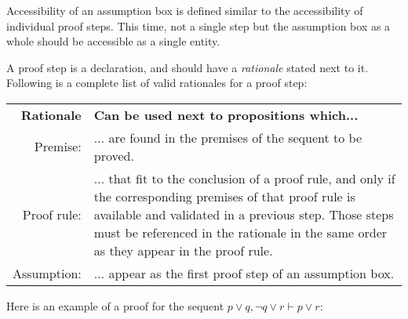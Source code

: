 \documentclass{article}
\newcommand{\seq}{\ensuremath{\vdash}}
\begin{document}
Accessibility of an assumption box is defined similar to the
accessibility of individual proof steps. This time, not a single
step but the assumption box as a whole should be accessible as a
single entity.

A proof step is a declaration, and should have a \textit{rationale}
stated next to it. Following is a complete list of valid rationales
for a proof step:
\begin{center}
	\begin{tabular}{r l}
		\textbf{Rationale} & \textbf{Can be used next to propositions which...}\\
		Premise: & ... are found in the premises of the sequent to be proved.\\
		Proof rule: & ... that fit to the conclusion of a proof rule, and only if the
			corresponding premises of that proof rule is available and validated in a
			previous step. Those steps must be referenced in the rationale in the
			same order as they appear in the proof rule.\\
		Assumption: & ... appear as the first proof step of an assumption box.
	\end{tabular}
\end{center}

Here is an example of a proof for the sequent
$p \lor q, \neg q \lor r \seq p \lor r$:
\end{document}
